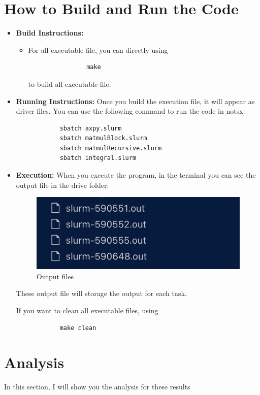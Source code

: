 \documentclass[11pt]{article}
\begin{document}
\newpage

\section{How to Build and Run the Code}
\label{sec:build_run}
\begin{itemize}
    \item \textbf{Build Instructions:} 
        \begin{itemize}
            \item For all executable file, you can directly using
            \begin{verbatim}
                make
            \end{verbatim}
            to build all executable file.
            
        \end{itemize}
    \item \textbf{Running Instructions:} 
        Once you build the execution file, it will appear as driver files. You can use the following command to run the code in notsx:
        \begin{verbatim}
            sbatch axpy.slurm
            sbatch matmulBlock.slurm
            sbatch matmulRecursive.slurm
            sbatch integral.slurm
        \end{verbatim}
    \item  \textbf{Execution: }
        When you execute the program, in the terminal you can see the output file in the drive folder:
        \begin{figure}[H]
            \centering
            \includegraphics[width=0.5\linewidth]{Assignments/HW2/docs/images/output_files.png}
            \caption{Output files}
            \label{fig:Output files}
        \end{figure}
        These output file will storage the output for each task.

        If you want to clean all executable files, using
        \begin{verbatim}
            make clean
        \end{verbatim}
\end{itemize}


\section{Analysis}
In this section, I will show you the analysis for these results
\end{document}
